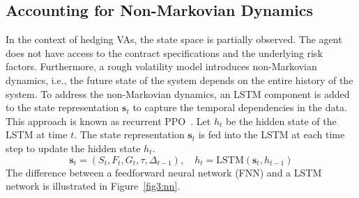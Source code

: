\subsection{Accounting for Non-Markovian Dynamics}

In the context of hedging VAs, the state space is partially observed.
The agent does not have access to the contract specifications and the underlying risk factors.
Furthermore, a rough volatility model introduces non-Markovian dynamics, i.e., the future state of the system depends on the entire history of the system.
To address the non-Markovian dynamics, an LSTM component is added to the state representation $\mathbf{s}_t$ to capture the temporal dependencies in the data.
This approach is known as recurrent PPO~\citep{ni2021recurrent}.
Let $h_t$ be the hidden state of the LSTM at time $t$.
The state representation $\mathbf{s}_t$ is fed into the LSTM at each time step to update the hidden state $h_t$.
\begin{equation} \label{eq3:stateRNN}
    \mathbf{s}_t = (S_t, F_t, G_t, \tau, \Delta_{t-1}), \quad h_t = \text{LSTM}(\mathbf{s}_t, h_{t-1})
\end{equation}
The difference between a feedforward neural network (FNN) and a LSTM network is illustrated in Figure~\ref{fig3:nn}.

